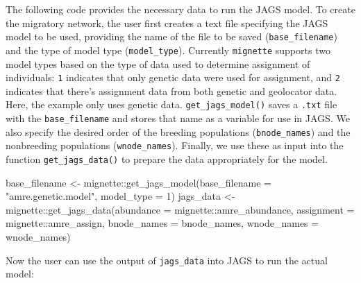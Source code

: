 \documentclass[
]{book}
\newenvironment{Shaded}{\begin{snugshade}}{\end{snugshade}}
\newcommand{\AttributeTok}[1]{\textcolor[rgb]{0.77,0.63,0.00}{#1}}
\newcommand{\DecValTok}[1]{\textcolor[rgb]{0.00,0.00,0.81}{#1}}
\newcommand{\FunctionTok}[1]{\textcolor[rgb]{0.00,0.00,0.00}{#1}}
\newcommand{\NormalTok}[1]{#1}
\newcommand{\OtherTok}[1]{\textcolor[rgb]{0.56,0.35,0.01}{#1}}
\newcommand{\SpecialCharTok}[1]{\textcolor[rgb]{0.00,0.00,0.00}{#1}}
\newcommand{\StringTok}[1]{\textcolor[rgb]{0.31,0.60,0.02}{#1}}
\begin{document}
The following code provides the necessary data to run the JAGS model. To create the migratory network, the user first creates a text file specifying the JAGS model to be used, providing the name of the file to be saved (\texttt{base\_filename}) and the type of model type (\texttt{model\_type}). Currently \texttt{mignette} supports two model types based on the type of data used to determine assignment of individuals: \texttt{1} indicates that only genetic data were used for assignment, and \texttt{2} indicates that there's assignment data from both genetic and geolocator data. Here, the example only uses genetic data. \texttt{get\_jags\_model()} saves a \texttt{.txt} file with the \texttt{base\_filename} and stores that name as a variable for use in JAGS. We also specify the desired order of the breeding populations (\texttt{bnode\_names}) and the nonbreeding populations (\texttt{wnode\_names}). Finally, we use these as input into the function \texttt{get\_jags\_data()} to prepare the data appropriately for the model.

\begin{Shaded}
\begin{Highlighting}[]
\NormalTok{base\_filename }\OtherTok{\textless{}{-}}\NormalTok{ mignette}\SpecialCharTok{::}\FunctionTok{get\_jags\_model}\NormalTok{(}\AttributeTok{base\_filename =} \StringTok{"amre.genetic.model"}\NormalTok{, }\AttributeTok{model\_type =} \DecValTok{1}\NormalTok{)}
\NormalTok{jags\_data }\OtherTok{\textless{}{-}}\NormalTok{ mignette}\SpecialCharTok{::}\FunctionTok{get\_jags\_data}\NormalTok{(}\AttributeTok{abundance =}\NormalTok{ mignette}\SpecialCharTok{::}\NormalTok{amre\_abundance, }
                           \AttributeTok{assignment =}\NormalTok{ mignette}\SpecialCharTok{::}\NormalTok{amre\_assign,}
                           \AttributeTok{bnode\_names =}\NormalTok{ bnode\_names, }
                           \AttributeTok{wnode\_names =}\NormalTok{ wnode\_names)}
\end{Highlighting}
\end{Shaded}

Now the user can use the output of \texttt{jags\_data} into JAGS to run the actual model:
\end{document}
